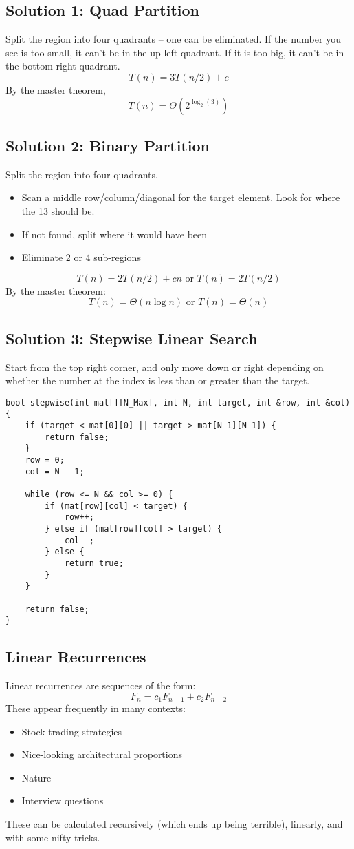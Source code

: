 \subsection{Solution 1: Quad Partition}
Split the region into four quadrants – one can be eliminated. If the number you see is too small, it can't be in the up left quadrant. If it is too big, it can't be in the bottom right quadrant.
$$T(n)=3T(n/2)+c$$
By the master theorem,
$$T(n)=\Theta (2^{\log_2 (3)})$$

\subsection{Solution 2: Binary Partition}
Split the region into four quadrants.
\begin{itemize}
	\item Scan a middle row/column/diagonal for the target element. Look for where the 13 should be.
	\item If not found, split where it would have been
	\item Eliminate 2 or 4 sub-regions
\end{itemize}
$$T(n)=2T(n/2)+cn\text{ or }T(n)=2T(n/2)$$
By the master theorem:
$$T(n)=\Theta (n\log n)\text{ or }T(n)=\Theta (n)$$

\subsection{Solution 3: Stepwise Linear Search}
Start from the top right corner, and only move down or right depending on whether the number at the index is less than or greater than the target.
\begin{lstlisting}[style=C++]
bool stepwise(int mat[][N_Max], int N, int target, int &row, int &col) {
    if (target < mat[0][0] || target > mat[N-1][N-1]) {
        return false;
    }
    row = 0;
    col = N - 1;

    while (row <= N && col >= 0) {
        if (mat[row][col] < target) {
            row++;
        } else if (mat[row][col] > target) {
            col--;
        } else {
            return true;
        }
    }

    return false;
}
\end{lstlisting}

\subsection{Linear Recurrences}
Linear recurrences are sequences of the form:
$$F_n = c_1 F_{n-1} + c_2 F_{n-2}$$
These appear frequently in many contexts:
\begin{itemize}
	\item Stock-trading strategies
	\item Nice-looking architectural proportions
	\item Nature
	\item Interview questions
\end{itemize}
These can be calculated recursively (which ends up being terrible), linearly, and with some nifty tricks.